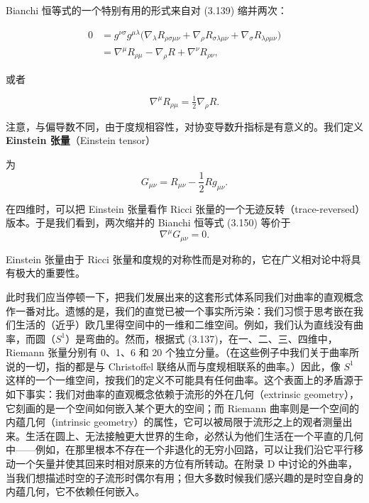 Bianchi 恒等式的一个特别有用的形式来自对 (3.139) 缩并两次：

\begin{align*}
0 &= g^{\nu\sigma}g^{\mu\lambda}\big(\nabla_\lambda R_{\rho\sigma\mu\nu} + \nabla_\rho R_{\sigma\lambda\mu\nu} + \nabla_\sigma R_{\lambda\rho\mu\nu}\big)\\
&= \nabla^\mu R_{\rho\mu} - \nabla_\rho R + \nabla^\nu R_{\rho\nu}, \tag{3.149}
\end{align*}

或者

\begin{equation*}
\nabla^\mu R_{\rho\mu} = \tfrac{1}{2}\nabla_\rho R. \tag{3.150}
\end{equation*}

注意，与偏导数不同，由于度规相容性，对协变导数升指标是有意义的。我们定义 \textbf{Einstein 张量}（Einstein tensor）

 为
\begin{equation*}
G_{\mu\nu} = R_{\mu\nu} - \frac{1}{2} R g_{\mu\nu}.
\tag{3.151}
\end{equation*}

在四维时，可以把 Einstein 张量看作 Ricci 张量的一个无迹反转（trace-reversed）版本。于是我们看到，两次缩并的 Bianchi 恒等式 (3.150) 等价于
\begin{equation*}
\nabla^\mu G_{\mu\nu} = 0.
\tag{3.152}
\end{equation*}

Einstein 张量由于 Ricci 张量和度规的对称性而是对称的，它在广义相对论中将具有极大的重要性。

此时我们应当停顿一下，把我们发展出来的这套形式体系同我们对曲率的直观概念作一番对比。遗憾的是，我们的直觉已被一个事实所污染：我们习惯于思考嵌在我们生活的（近乎）欧几里得空间中的一维和二维空间。例如，我们认为直线没有曲率，而圆（$S^1$）是弯曲的。然而，根据式 (3.137)，在一、二、三、四维中，Riemann 张量分别有 0、1、6 和 20 个独立分量。（在这些例子中我们关于曲率所说的一切，指的都是与 Christoffel 联络从而与度规相联系的曲率。）因此，像 $S^1$ 这样的一个一维空间，按我们的定义不可能具有任何曲率。这个表面上的矛盾源于如下事实：我们对曲率的直观概念依赖于流形的外在几何（extrinsic geometry），它刻画的是一个空间如何嵌入某个更大的空间；而 Riemann 曲率则是一个空间的内蕴几何（intrinsic geometry）的属性，它可以被局限于流形之上的观者测量出来。生活在圆上、无法接触更大世界的生命，必然认为他们生活在一个平直的几何中——例如，在那里根本不存在一个非退化的无穷小回路，可以让我们沿它平行移动一个矢量并使其回来时相对原来的方位有所转动。在附录 D 中讨论的外曲率，当我们想描述时空的子流形时偶尔有用；但大多数时候我们感兴趣的是时空自身的内蕴几何，它不依赖任何嵌入。

